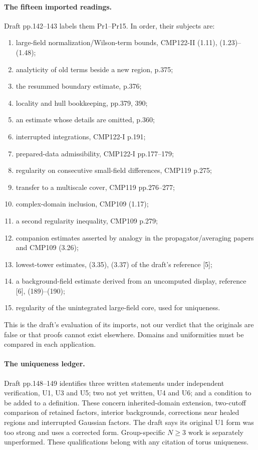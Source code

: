 \paragraph{The fifteen imported readings.}
Draft pp.142--143 labels them Pr1--Pr15. In order,
their subjects are:
\begin{enumerate}
\item large-field normalization/Wilson-term bounds,
CMP122-II (1.11), (1.23)--(1.48);
\item analyticity of old terms beside a new region, p.375;
\item the resummed boundary estimate, p.376;
\item locality and hull bookkeeping, pp.379, 390;
\item an estimate whose details are omitted, p.360;
\item interrupted integrations, CMP122-I p.191;
\item prepared-data admissibility, CMP122-I pp.177--179;
\item regularity on consecutive small-field differences,
CMP119 p.275;
\item transfer to a multiscale cover, CMP119 pp.276--277;
\item complex-domain inclusion, CMP109 (1.17);
\item a second regularity inequality, CMP109 p.279;
\item companion estimates asserted by analogy in the
propagator/averaging papers and CMP109 (3.26);
\item lowest-tower estimates, (3.35), (3.37) of
the draft's reference [5];
\item a background-field estimate derived from an
uncomputed display, reference [6], (189)--(190);
\item regularity of the unintegrated large-field core,
used for uniqueness.
\end{enumerate}
This is the draft's evaluation of its imports, not
our verdict that the originals are false or that
proofs cannot exist elsewhere. Domains and uniformities
must be compared in each application.

\paragraph{The uniqueness ledger.}
Draft pp.148--149 identifies three written statements
under independent verification, U1, U3 and U5;
two not yet written, U4 and U6; and a condition to
be added to a definition. These concern inherited-domain
extension, two-cutoff comparison of retained factors,
interior backgrounds, corrections near healed regions
and interrupted Gaussian factors. The draft says its
original U1 form was too strong and uses a corrected
form. Group-specific \(N\geq3\) work is separately
unperformed. These qualifications belong with any
citation of torus uniqueness.

